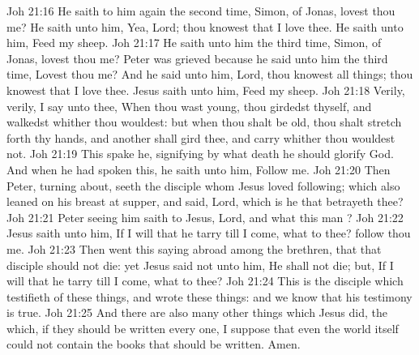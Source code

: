 \vs Joh 21:16 He saith to him again the second time, Simon,  of Jonas, lovest thou me? He saith unto him, Yea, Lord; thou knowest that I love thee. He saith unto him, Feed my sheep.
\vs Joh 21:17 He saith unto him the third time, Simon,  of Jonas, lovest thou me? Peter was grieved because he said unto him the third time, Lovest thou me? And he said unto him, Lord, thou knowest all things; thou knowest that I love thee. Jesus saith unto him, Feed my sheep.
\vs Joh 21:18 Verily, verily, I say unto thee, When thou wast young, thou girdedst thyself, and walkedst whither thou wouldest: but when thou shalt be old, thou shalt stretch forth thy hands, and another shall gird thee, and carry  whither thou wouldest not.
\vs Joh 21:19 This spake he, signifying by what death he should glorify God. And when he had spoken this, he saith unto him, Follow me.
\vs Joh 21:20 Then Peter, turning about, seeth the disciple whom Jesus loved following; which also leaned on his breast at supper, and said, Lord, which is he that betrayeth thee?
\vs Joh 21:21 Peter seeing him saith to Jesus, Lord, and what  this man ?
\vs Joh 21:22 Jesus saith unto him, If I will that he tarry till I come, what  to thee? follow thou me.
\vs Joh 21:23 Then went this saying abroad among the brethren, that that disciple should not die: yet Jesus said not unto him, He shall not die; but, If I will that he tarry till I come, what  to thee?
\vs Joh 21:24 This is the disciple which testifieth of these things, and wrote these things: and we know that his testimony is true.
\vs Joh 21:25 And there are also many other things which Jesus did, the which, if they should be written every one, I suppose that even the world itself could not contain the books that should be written. Amen.
